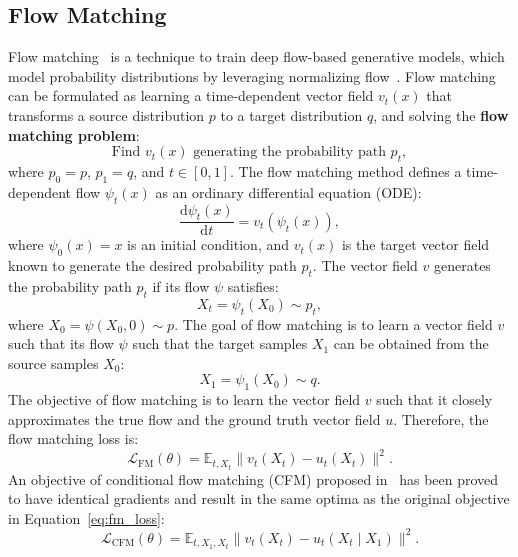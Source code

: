 \documentclass[sigconf]{acmart}
\begin{document}
\subsection{Flow Matching}

Flow matching~\cite{lipman2022flow, liu2022flow} is a technique to train deep flow-based generative models, which model probability distributions by leveraging normalizing flow~\cite{chen2018neural, papamakarios2021normalizing}. Flow matching can be formulated as learning a time-dependent vector field $v_t(x)$ that transforms a source distribution $p$ to a target distribution $q$, and solving the \textbf{flow matching problem}:
\begin{equation}
    \text{Find } v_t(x) \text{ generating the probability path } p_t,
\end{equation}
where $p_0 = p$, $p_1 = q$, and $t \in [0, 1]$.
The flow matching method defines a time-dependent flow $\psi_t(x)$ as an ordinary differential equation (ODE):
\begin{equation}
    \frac{\mathrm d \psi_t(x)}{\mathrm d t} = v_t(\psi_t(x)),
\end{equation}
where $\psi_0(x) = x$ is an initial condition, and $v_t(x)$ is the target vector field known to generate the desired probability path $p_t$. The vector field $v$ generates the probability path $p_t$ if its flow $\psi$ satisfies:
\begin{equation}
    \label{eq:flow}
    X_t = \psi_t(X_0) \sim p_t,
\end{equation}
where $X_0 = \psi(X_0, 0) \sim p$. The goal of flow matching is to learn a vector field $v$ such that its flow $\psi$ such that the target samples $X_1$ can be obtained from the source samples $X_0$:
\begin{equation}
    X_1 = \psi_1(X_0) \sim q.
\end{equation}
The objective of flow matching is to learn the vector field $v$ such that it closely approximates the true flow and the ground truth vector field $u$. Therefore, the flow matching loss is:
\begin{equation}
    \label{eq:fm_loss}
    \mathcal{L}_{\mathrm{FM}}(\theta) = \mathbb{E}_{t, X_t} \|v_t(X_t) - u_t(X_t)\|^2.
\end{equation}
An objective of conditional flow matching (CFM) proposed in~\cite{lipman2022flow} has been proved to have identical gradients and result in the same optima as the original objective in Equation~\ref{eq:fm_loss}:
\begin{equation}
    \label{eq:cfm_loss}
    \mathcal{L}_{\mathrm{CFM}}(\theta) = \mathbb{E}_{t, X_1, X_t} \|v_t(X_t) - u_t(X_t \mid X_1)\|^2.
\end{equation}
\end{document}
